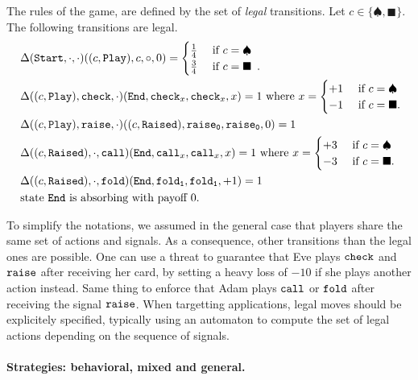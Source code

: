 The rules of the game,
are defined by the set of \emph{legal} transitions.
Let $c \in \{\spadesuit,\blacksquare\}$.
The following transitions are legal.
\begin{align*}
&~\Delta({\tt Start},{\tt \cdot},{\tt \cdot})((c,{\tt Play}),c,\circ,0)=
\begin{cases}
\frac{1}{4}& \text{ if } c= \spadesuit\\
\frac{3}{4}& \text{ if } c= \blacksquare\enspace.
\end{cases}\\
&~\Delta((c,{\tt Play}),{\tt check},{\tt \cdot})({\tt End},{\tt check}_x,{\tt check}_x,x)=1
\text{ where } x=
\begin{cases}
+1 & \text{ if } c=\spadesuit\\
-1& \text{ if } c=\blacksquare.
\end{cases}
\\
&~\Delta((c,{\tt Play}),{\tt raise},{\tt \cdot})((c,{\tt Raised}),{\tt raise_0},{\tt raise_0},0)=1\\
&~\Delta((c,{\tt Raised}),{\tt \cdot},{\tt call})({\tt End},{\tt call}_x,{\tt call}_x,x)=1 
\text{ where } x=
\begin{cases}
+3 & \text{ if } c=\spadesuit\\
-3 & \text{ if } c=\blacksquare.
\end{cases}
\\
&~\Delta((c,{\tt Raised}),{\tt \cdot},{\tt fold})({\tt End},{\tt fold_1},{\tt fold_1},+1)=1\\
&~\text{state ${\tt End}$ is absorbing with payoff $0$.}
\end{align*}




To simplify the notations,
we assumed in the general case
that players share the same set of actions and signals.
As a consequence, other transitions than the legal ones
are possible. 
One can use a threat to guarantee that Eve plays
${\tt check}$ and ${\tt raise}$ after receiving her card,
by setting a heavy loss of $-10$ if she plays another action instead.
Same thing to enforce that Adam plays ${\tt call}$ or ${\tt fold}$
after receiving the signal ${\tt raise}$.
When targetting applications,
legal moves should be explicitely
specified, typically using an automaton
to compute the set of legal actions
depending on the sequence of signals.



\paragraph{Strategies: behavioral, mixed and general.}

